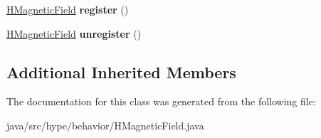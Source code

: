 \begin{DoxyCompactItemize}
\item 
\hypertarget{classhype_1_1behavior_1_1_h_magnetic_field_ab7711de4588828606ed2590e1681279a}{\hyperlink{classhype_1_1behavior_1_1_h_magnetic_field}{H\-Magnetic\-Field} {\bfseries register} ()}\label{classhype_1_1behavior_1_1_h_magnetic_field_ab7711de4588828606ed2590e1681279a}

\item 
\hypertarget{classhype_1_1behavior_1_1_h_magnetic_field_a3b17a1968dee1b61220256a06e10980f}{\hyperlink{classhype_1_1behavior_1_1_h_magnetic_field}{H\-Magnetic\-Field} {\bfseries unregister} ()}\label{classhype_1_1behavior_1_1_h_magnetic_field_a3b17a1968dee1b61220256a06e10980f}

\end{DoxyCompactItemize}
\subsection*{Additional Inherited Members}


The documentation for this class was generated from the following file\-:\begin{DoxyCompactItemize}
\item 
java/src/hype/behavior/H\-Magnetic\-Field.\-java\end{DoxyCompactItemize}
